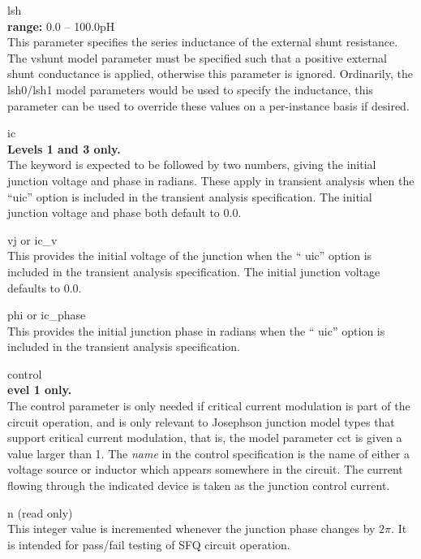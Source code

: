 \begin{description}
\item{\vt lsh}\\
{\bf range:} 0.0 -- 100.0pH\\
This parameter specifies the series inductance of the external shunt
resistance.  The {\vt vshunt} model parameter must be specified such
that a positive external shunt conductance is applied, otherwise this
parameter is ignored.  Ordinarily, the {\vt lsh0}/{\vt lsh1} model
parameters would be used to specify the inductance, this parameter can
be used to override these values on a per-instance basis if desired.

\item{\vt ic}\\
{\bf Levels 1 and 3 only.}\\
The keyword is expected to be followed by two numbers, giving the
initial junction voltage and phase in radians.  These apply in
transient analysis when the ``{\vt uic}'' option is included in the
transient analysis specification.  The initial junction voltage and
phase both default to 0.0.

\item{{\vt vj} or {\vt ic\_v}}\\
This provides the initial voltage of the junction when the ``{\vt
uic}'' option is included in the transient analysis specification. 
The initial junction voltage defaults to 0.0.

\item{{\vt phi} or {\vt ic\_phase}}\\
This provides the initial junction phase in radians when the ``{\vt
uic}'' option is included in the transient analysis specification.

\item{\vt control}\\
{\bf evel 1 only.}\\
The {\vt control} parameter is only needed if critical current
modulation is part of the circuit operation, and is only relevant to
Josephson junction model types that support critical current
modulation, that is, the model parameter {\vt cct} is given a value
larger than 1.  The {\it name} in the {\vt control} specification is
the name of either a voltage source or inductor which appears
somewhere in the circuit.  The current flowing through the indicated
device is taken as the junction control current.

\item{\vt n} (read only)\\
This integer value is incremented whenever the junction phase changes
by $2\pi$.  It is intended for pass/fail testing of SFQ circuit
operation.
 

\end{description}
